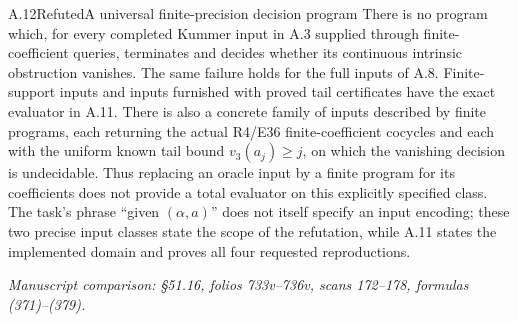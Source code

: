 \begin{statement}{A.12}{Refuted}{A universal finite-precision decision program}
There is no program which, for every completed Kummer input in
A.3 supplied through finite-coefficient queries, terminates and
decides whether its continuous intrinsic obstruction vanishes.
The same failure holds for the full inputs of A.8. Finite-support
inputs and inputs furnished with proved tail certificates have
the exact evaluator in A.11.
There is also a concrete family of inputs described by finite
programs, each returning the actual R4/E36 finite-coefficient
cocycles and each with the uniform known tail bound
$v_3(a_j)\ge j$, on which the vanishing decision is
undecidable. Thus replacing an oracle input by a finite program
for its coefficients does not provide a total evaluator on
this explicitly specified class. The task's phrase ``given
$(\alpha,a)$'' does not itself specify an input encoding;
these two precise input classes state the scope of the
refutation, while A.11 states the implemented domain and
proves all four requested reproductions.
\par\smallskip\noindent\emph{Manuscript comparison: \S51.16,
folios 733v--736v, scans 172--178, formulas (371)--(379).}
\end{statement}
